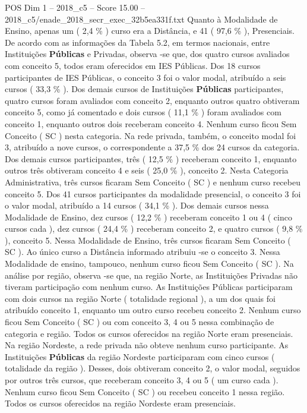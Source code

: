 \begin{textsample}{POS Dim 1 – 2018\_c5 – Score 15.00 – 2018\_c5/enade\_2018\_secr\_exec\_32b5ea331f.txt}
Quanto à Modalidade de Ensino, apenas um ( 2,4 \% ) curso era a Distância, e 41 ( 97,6 \% ), Presenciais.
De acordo com as informações da Tabela 5.2, em termos nacionais, entre Instituições \textbf{Públicas} e Privadas, observa -se que, dos quatro cursos avaliados com conceito 5, todos eram oferecidos em IES Públicas.
Dos 18 cursos participantes de IES Públicas, o conceito 3 foi o valor modal, atribuído a seis cursos ( 33,3 \% ).
Dos demais cursos de Instituições \textbf{Públicas} participantes, quatro cursos foram avaliados com conceito 2, enquanto outros quatro obtiveram conceito 5, como já comentado e dois cursos ( 11,1 \% ) foram avaliados com conceito 1, enquanto outros dois receberam conceito 4.
Nenhum curso ficou Sem Conceito ( SC ) nesta categoria.
Na rede privada, também, o conceito modal foi 3, atribuído a nove cursos, o correspondente a 37,5 \% dos 24 cursos da categoria.
Dos demais cursos participantes, três ( 12,5 \% ) receberam conceito 1, enquanto outros três obtiveram conceito 4 e seis ( 25,0 \% ), conceito 2.
Nesta Categoria Administrativa, três cursos ficaram Sem Conceito ( SC ) e nenhum curso recebeu conceito 5.
Dos 41 cursos participantes da modalidade presencial, o conceito 3 foi o valor modal, atribuído a 14 cursos ( 34,1 \% ).
Dos demais cursos nessa Modalidade de Ensino, dez cursos ( 12,2 \% ) receberam conceito 1 ou 4 ( cinco cursos cada ), dez cursos ( 24,4 \% ) receberam conceito 2, e quatro cursos ( 9,8 \% ), conceito 5.
Nessa Modalidade de Ensino, três cursos ficaram Sem Conceito ( SC ).
Ao único curso a Distância informado atribuiu -se o conceito 3.
Nessa Modalidade de ensino, tampouco, nenhum curso ficou Sem Conceito ( SC ).
Na análise por região, observa -se que, na região Norte, as Instituições Privadas não tiveram participação com nenhum curso.
As Instituições Públicas participaram com dois cursos na região Norte ( totalidade regional ), a um dos quais foi atribuído conceito 1, enquanto um outro curso recebeu conceito 2.
Nenhum curso ficou Sem Conceito ( SC ) ou com conceito 3, 4 ou 5 nessa combinação de categoria e região.
Todos os cursos oferecidos na região Norte eram presenciais.
Na região Nordeste, a rede privada não obteve nenhum curso participante.
As Instituições \textbf{Públicas} da região Nordeste participaram com cinco cursos ( totalidade da região ).
Desses, dois obtiveram conceito 2, o valor modal, seguidos por outros três cursos, que receberam conceito 3, 4 ou 5 ( um curso cada ).
Nenhum curso ficou Sem Conceito ( SC ) ou recebeu conceito 1 nessa região.
Todos os cursos oferecidos na região Nordeste eram presenciais.

\end{textsample}

